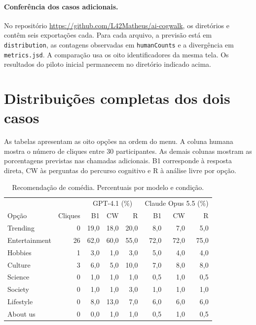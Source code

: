 \documentclass[12pt]{article}
\newcommand{\code}[1]{\texttt{#1}}
\begin{document}
\paragraph{Conferência dos casos adicionais.} No repositório \url{https://github.com/L42Matheus/ai-cogwalk}, os diretórios  e  contêm seis exportações cada. Para cada arquivo, a previsão está em \code{distribution}, as contagens observadas em \code{humanCounts} e a divergência em \code{metrics.jsd}. A comparação usa os oito identificadores da mesma tela. Os resultados do piloto inicial permanecem no diretório indicado acima.

\clearpage
\section{Distribuições completas dos dois casos}
As tabelas apresentam as oito opções na ordem do menu. A coluna humana mostra o número de cliques entre 30 participantes. As demais colunas mostram as porcentagens previstas nas chamadas adicionais. B1 corresponde à resposta direta, CW às perguntas do percurso cognitivo e R à análise livre por opção.

\begin{table}[!ht]\centering\small\caption{Recomendação de comédia. Percentuais por modelo e condição.}\begin{tabular}{lrrrrrrr}\toprule
 & & \multicolumn{3}{c}{GPT-4.1 (\%)} & \multicolumn{3}{c}{Claude Opus 5.5 (\%)} \\ Opção & Cliques & B1 & CW & R & B1 & CW & R \\ \midrule
Trending & 0 & 19,0 & 18,0 & 20,0 & 8,0 & 7,0 & 5,0 \\
Entertainment & 26 & 62,0 & 60,0 & 55,0 & 72,0 & 72,0 & 75,0 \\
Hobbies & 1 & 3,0 & 1,0 & 3,0 & 5,0 & 4,0 & 4,0 \\
Culture & 3 & 6,0 & 5,0 & 10,0 & 7,0 & 8,0 & 8,0 \\
Science & 0 & 1,0 & 1,0 & 1,0 & 0,5 & 1,0 & 0,5 \\
Society & 0 & 1,0 & 1,0 & 3,0 & 1,0 & 1,0 & 1,0 \\
Lifestyle & 0 & 8,0 & 13,0 & 7,0 & 6,0 & 6,0 & 6,0 \\
About us & 0 & 0,0 & 1,0 & 1,0 & 0,5 & 1,0 & 0,5 \\
\bottomrule\end{tabular}\end{table}
\end{document}
